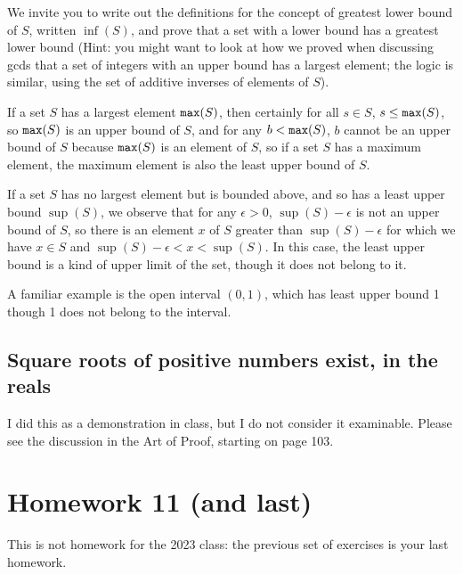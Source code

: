\documentclass[12pt]{article}
\begin{document}
We invite you to write out the definitions for the concept of greatest lower bound of $S$, written $\inf(S)$, and prove that
a set with a lower bound has a greatest lower bound (Hint:  you might want to look at how we proved when discussing gcds that a set of integers with an upper bound has a largest element;  the logic is similar, using the set of additive inverses of elements of $S$).

If a set $S$ has a largest element ${\tt max}(S)$, then certainly for all $s \in S$, $s \leq {\tt max}(S)$, so ${\tt max}(S)$ is an upper bound of $S$, and for any $b < {\tt max}(S)$, $b$ cannot be an upper bound of $S$ because ${\tt max}(S)$ is an element of $S$, so if a set $S$ has a maximum element, the maximum element is also the least upper bound of $S$.

If a set $S$ has no largest element but is bounded above, and so has a least upper bound $\sup(S)$, we observe that for any $\epsilon>0$, $\sup(S)-\epsilon$ is not an upper bound of $S$, so there is an element $x$ of $S$ greater than $\sup(S)-\epsilon$ for which we have $x \in S$ and $\sup(S)-\epsilon<x<\sup(S)$.  In this case, the least upper bound is a kind of upper limit of the set, though it does not belong to it.

A familiar example is the open interval $(0,1)$, which has least upper bound 1 though 1 does not belong to the interval.

\subsection{Square roots of positive numbers exist, in the reals}

I did this as a demonstration in class, but I do not consider it examinable.  Please see the discussion in the Art of Proof, starting on page 103.

\newpage

\section{Homework 11 (and last)}

This is not homework for the 2023 class:  the previous set of exercises is your last homework.
\end{document}

